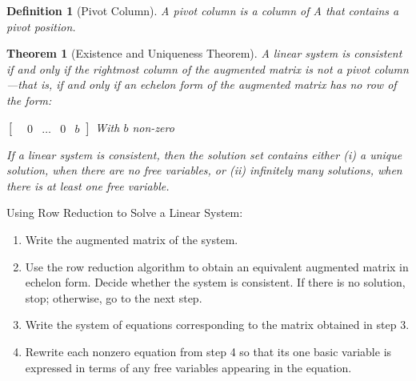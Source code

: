 \documentclass[oneside]{report}
\newtheorem{theorem}{Theorem}[section]
\newtheorem{definition}{Definition}[section]
\begin{document}
\begin{definition}[Pivot Column]
  A pivot column is a column of A that contains
  a pivot position.
\end{definition}

\begin{theorem}[Existence and Uniqueness Theorem]
  A linear system is consistent if and only if the rightmost column of the augmented
  matrix is not a pivot column—that is, if and only if an echelon form of the
  augmented matrix has no row of the form:

  \begin{center}
    $\begin{bmatrix}
      &0 &\dots &0  &b
    \end{bmatrix}$
    With $b$ non-zero
  \end{center}
If a linear system is consistent, then the solution set contains either (i) a unique
  solution, when there are no free variables, or (ii) infinitely many solutions, when
  there is at least one free variable.
\end{theorem}

Using Row Reduction to Solve a Linear System:
\begin{enumerate}
  \item Write the augmented matrix of the system.
  \item Use the row reduction algorithm to obtain an equivalent augmented matrix in echelon form. Decide whether the system is consistent. If there is no solution, stop; otherwise, go to the next step.
  \item Write the system of equations corresponding to the matrix obtained in step 3.
  \item Rewrite each nonzero equation from step 4 so that its one basic variable is expressed in terms of any free variables appearing in the equation.
\end{enumerate}
\end{document}
